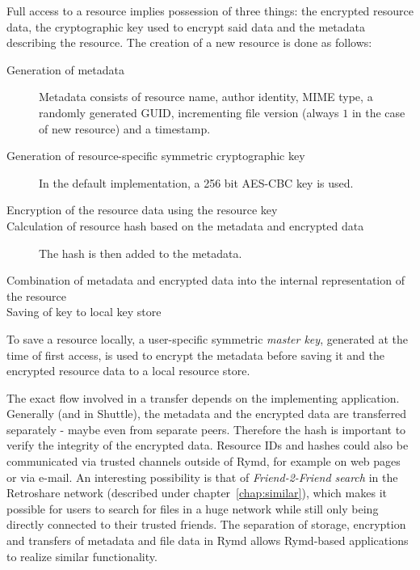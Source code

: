 Full access to a resource implies possession of three things: the encrypted resource data, the cryptographic key used to encrypt said data and the metadata describing the resource. The creation of a new resource is done as follows:

\begin{description}
  \item[Generation of metadata] Metadata consists of resource name, author identity, MIME type, a randomly generated GUID, incrementing file version (always $1$ in the case of new resource) and a timestamp.
  \item[Generation of resource-specific symmetric cryptographic key] In the default implementation, a 256 bit AES-CBC key is used.
  \item[Encryption of the resource data using the resource key]
  \item[Calculation of resource hash based on the metadata and encrypted data] The hash is then added to the metadata.
  \item[Combination of metadata and encrypted data into the internal representation of the resource]
  \item[Saving of key to local key store]
\end{description}

To save a resource locally, a user-specific symmetric \emph{master key}, generated at the time of first access, is used to encrypt the metadata before saving it and the encrypted resource data to a local resource store.

The exact flow involved in a transfer depends on the implementing application. Generally (and in Shuttle), the metadata and the encrypted data are transferred separately - maybe even from separate peers. Therefore the hash is important to verify the integrity of the encrypted data. Resource IDs and hashes could also be communicated via trusted channels outside of Rymd, for example on web pages or via e-mail. An interesting possibility is that of \emph{Friend-2-Friend search} in the Retroshare network (described under chapter~\ref{chap:similar}), which makes it possible for users to search for files in a huge network while still only being directly connected to their trusted friends. The separation of storage, encryption and transfers of metadata and file data in Rymd allows Rymd-based applications to realize similar functionality.

